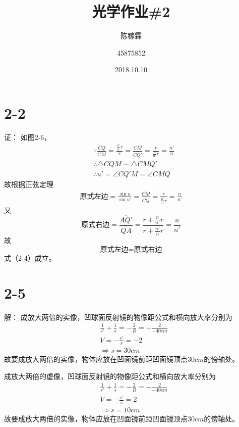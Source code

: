 \documentclass[10pt,a4paper]{article}
\title{光学作业\#2}
\author{陈稼霖 \and 45875852}
\date{2018.10.10}
\theoremstyle{remark}
\begin{document}
\maketitle
\section*{2-2}证：
如图2-6，
\begin{align*}
&\because\frac{\overline{CQ}}{\overline{CM}} = \frac{\frac{n'}{n}r}{r} = \frac{\overline{CM}}{\overline{CQ'}} = \frac{r}{\frac{n}{n'}r} = \frac{n'}{n}\\
&\therefore\triangle CQM \backsim \triangle CMQ'\\
&\therefore u' = \angle CQ'M = \angle CMQ
\end{align*}
故根据正弦定理
\begin{align*}
\text{原式左边} = \frac{\sin u}{\sin u'} = \frac{\overline{CM}}{\overline{CQ}} = \frac{r}{\frac{n'}{n}r} = \frac{n}{n'}
\end{align*}
又
\[
\text{原式右边} = \frac{\overline{AQ'}}{\overline{QA}} = \frac{r + \frac{n}{n'}r}{r + \frac{n'}{n}r} = \frac{n}{n'}
\]
故
\[
\text{原式左边} = \text{原式右边}
\]
式（2-4）成立。
\section*{2-5}解：
成放大两倍的实像，凹球面反射镜的物像距公式和横向放大率分别为
\begin{align*}
&\frac{1}{s'} + \frac{1}{s} = -\frac{2}{R} = -\frac{2}{-40cm}\\
&V = -\frac{s'}{s} = -2\\
&\Longrightarrow s = 30cm
\end{align*}
故要成放大两倍的实像，物体应放在凹面镜前距凹面镜顶点$30cm$的傍轴处。

成放大两倍的虚像，凹球面反射镜的物像距公式和横向放大率分别为
\begin{align*}
&\frac{1}{s'} + \frac{1}{s} = -\frac{2}{R} = -\frac{2}{-40cm}\\
&V = -\frac{s'}{s} = 2\\
&\Longrightarrow s = 10cm
\end{align*}
故要成放大两倍的实像，物体应放在凹面镜前距凹面镜顶点$30cm$的傍轴处。
\end{document}
